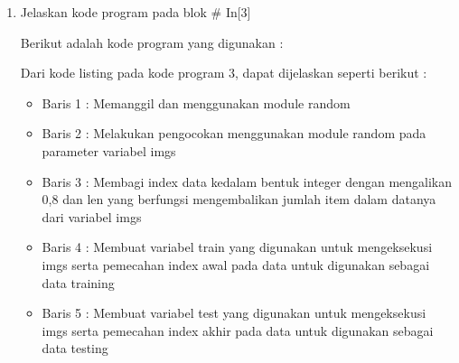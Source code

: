 \begin{enumerate}
\begin{itemize}
\item Baris 7	: Mengaplikasikan atau menggunakan perintah "if" dengan variabel i lebih besar dari 0, yang selanjutnya akan dilanjutkan ke perintah berikutnya
\item Baris 8	: Membuat variabel img yang berfungsi untuk mengubah image atau gambar menjadi bentuk array (bilangan) dari file HASYv2 yang dibuka dengan row berparameter 0.
\item Baris 9	: Membuat variabel img dengan nilai bukan sama dengan 255.0
\item Baris 10 : Mendefinisikan fungsi imgs.append yang digunakan untuk melakukan proses penggabungan data dengan file lain atau dataset lain yang telah ditentukan dengan 3 parameter yaitu row[0], row[2] dan variabel img.
\item Baris 11 : Mendefinisikan fungsi append dari variabel classes dengan menggunakan parameter row[2].
\item Baris 12 : Mengartikan i=i+1 yang dimana nilai sari variabel i akan ditambah 1 sehingga akan bernilai 1.
\end{itemize}
\par Sehingga dari kode program tersebut bila dijalankan, maka menghasilkan seperti pada gambar \ref{c7_9}.
\begin{figure}[!htbp]
	\centerline{\texttt{[image: figures/huda/chapter7/9.JPG]}}
	\caption{In[2]}
	\label{c7_9}
\end{figure}
\item Jelaskan kode program pada blok \# In[3]
\par Berikut adalah kode program yang digunakan :

\par Dari kode listing pada kode program 3, dapat dijelaskan seperti berikut :
\begin{itemize}
\item Baris 1	: Memanggil dan menggunakan module random
\item Baris 2	: Melakukan pengocokan menggunakan module random pada parameter variabel imgs
\item Baris 3	: Membagi index data kedalam bentuk integer dengan mengalikan 0,8 dan len yang berfungsi mengembalikan jumlah item dalam datanya dari variabel imgs
\item Baris 4	: Membuat variabel train yang digunakan untuk mengeksekusi imgs serta pemecahan index awal pada data untuk digunakan sebagai data training
\item Baris 5	: Membuat variabel test yang digunakan untuk mengeksekusi imgs serta pemecahan index akhir pada data untuk digunakan sebagai data testing

\end{itemize}
\end{enumerate}
